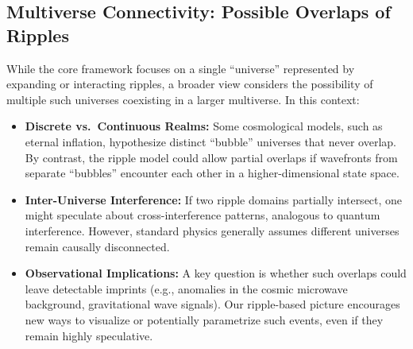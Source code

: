 \documentclass[11pt]{article}
\begin{document}
\subsection{Multiverse Connectivity: Possible Overlaps of Ripples}
\label{subsec:multiverse-ripples}
While the core framework focuses on a single “universe” represented by 
expanding or interacting ripples, a broader view considers the possibility 
of multiple such universes coexisting in a larger multiverse. In this context:
\begin{itemize}
  \item \textbf{Discrete vs.\ Continuous Realms:} Some cosmological models, 
        such as eternal inflation, hypothesize distinct “bubble” universes 
        that never overlap. By contrast, the ripple model could allow 
        partial overlaps if wavefronts from separate “bubbles” encounter 
        each other in a higher-dimensional state space.
  \item \textbf{Inter-Universe Interference:} If two ripple domains 
        partially intersect, one might speculate about cross-interference 
        patterns, analogous to quantum interference. However, standard 
        physics generally assumes different universes remain causally 
        disconnected.
  \item \textbf{Observational Implications:} A key question is whether 
        such overlaps could leave detectable imprints (e.g., anomalies 
        in the cosmic microwave background, gravitational wave signals). 
        Our ripple-based picture encourages new ways to visualize or 
        potentially parametrize such events, even if they remain highly 
        speculative.
\end{itemize}
\end{document}
